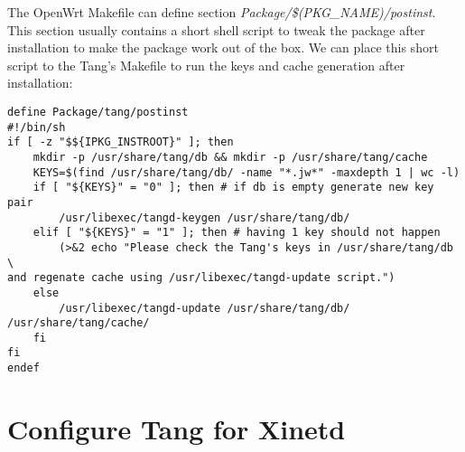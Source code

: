 The OpenWrt Makefile can define section {\it Package/\$(PKG\_NAME)/postinst}.
This section usually contains a short shell script to tweak the package after installation to make the package work out of the box.
We can place this short script to the Tang's Makefile to run the keys and cache generation after installation:
\begin{lstlisting}[columns=fixed,basicstyle=\ttfamily\footnotesize,tabsize=4,backgroundcolor=\color{yellow!10}]
define Package/tang/postinst
#!/bin/sh
if [ -z "$${IPKG_INSTROOT}" ]; then
	mkdir -p /usr/share/tang/db && mkdir -p /usr/share/tang/cache
	KEYS=$(find /usr/share/tang/db/ -name "*.jw*" -maxdepth 1 | wc -l)
	if [ "${KEYS}" = "0" ]; then # if db is empty generate new key pair
		/usr/libexec/tangd-keygen /usr/share/tang/db/
	elif [ "${KEYS}" = "1" ]; then # having 1 key should not happen
		(>&2 echo "Please check the Tang's keys in /usr/share/tang/db \
and regenate cache using /usr/libexec/tangd-update script.")
	else
		/usr/libexec/tangd-update /usr/share/tang/db/ /usr/share/tang/cache/
	fi
fi
endef
\end{lstlisting}



\section{Configure Tang for Xinetd}

